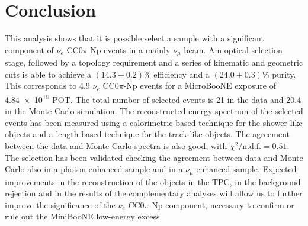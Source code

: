 
\section{Conclusion}
This analysis shows that it is possible select a sample with a significant component of $\nu_{e}$ CC0$\pi$-Np events in a mainly $\nu_\mu$ beam. Am optical selection stage, followed by a topology requirement and a series of kinematic and geometric cuts is able to achieve a $(14.3\pm0.2)\%$ efficiency and a $(24.0\pm0.3)\%$ purity. This corresponds to 4.9 $\nu_{e}$ CC0$\pi$-Np events for a MicroBooNE exposure of \num{4.84e19} POT. The total number of selected events is 21 in the data and 20.4 in the Monte Carlo simulation. 
The reconstructed energy spectrum of the selected events has been measured using a calorimetric-based technique for the shower-like objects and a length-based technique for the track-like objects. The agreement between the data and Monte Carlo spectra is also good, with $\chi^{2} / \mathrm{n.d.f.} = 0.51$.
The selection has been validated checking the agreement between data and Monte Carlo also in a photon-enhanced sample and in a $\nu_\mu$-enhanced sample.
Expected improvements in the reconstruction of the objects in the TPC, in the background rejection and in the results of the complementary analyses will allow us to further improve the significance of the $\nu_{e}$ CC0$\pi$-Np component, necessary to confirm or rule out the MiniBooNE low-energy excess.